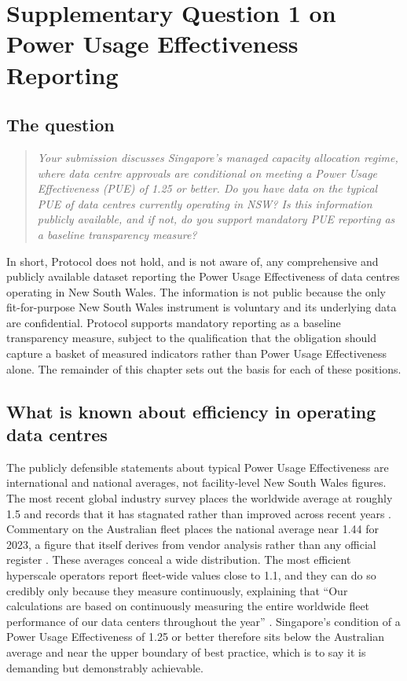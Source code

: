 \chapter{Supplementary Question 1 on Power Usage Effectiveness Reporting}
\label{ch:supp:pue}

\section{The question}
\label{sec:supp:pue:q}

\begin{quote}
\itshape
Your submission discusses Singapore's managed capacity allocation regime, where data centre approvals are conditional on meeting a Power Usage Effectiveness (PUE) of 1.25 or better. Do you have data on the typical PUE of data centres currently operating in NSW? Is this information publicly available, and if not, do you support mandatory PUE reporting as a baseline transparency measure?
\end{quote}

In short, Protocol does not hold, and is not aware of, any comprehensive and publicly available dataset reporting the Power Usage Effectiveness of data centres operating in New South Wales. The information is not public because the only fit-for-purpose New South Wales instrument is voluntary and its underlying data are confidential. Protocol supports mandatory reporting as a baseline transparency measure, subject to the qualification that the obligation should capture a basket of measured indicators rather than Power Usage Effectiveness alone. The remainder of this chapter sets out the basis for each of these positions.

\section{What is known about efficiency in operating data centres}
\label{sec:supp:pue:known}

The publicly defensible statements about typical Power Usage Effectiveness are international and national averages, not facility-level New South Wales figures. The most recent global industry survey places the worldwide average at roughly 1.5 and records that it has stagnated rather than improved across recent years \autocite{uptimeGlobalDataCentreSurvey2025}. Commentary on the Australian fleet places the national average near 1.44 for 2023, a figure that itself derives from vendor analysis rather than any official register \autocite{nlyteAustralianDataCentreEfficiency2024}. These averages conceal a wide distribution. The most efficient hyperscale operators report fleet-wide values close to 1.1, and they can do so credibly only because they measure continuously, explaining that \enquote{Our calculations are based on continuously measuring the entire worldwide fleet performance of our data centers throughout the year} \autocite{googleDataCentreEfficiency2025}. Singapore's condition of a Power Usage Effectiveness of 1.25 or better therefore sits below the Australian average and near the upper boundary of best practice, which is to say it is demanding but demonstrably achievable.

